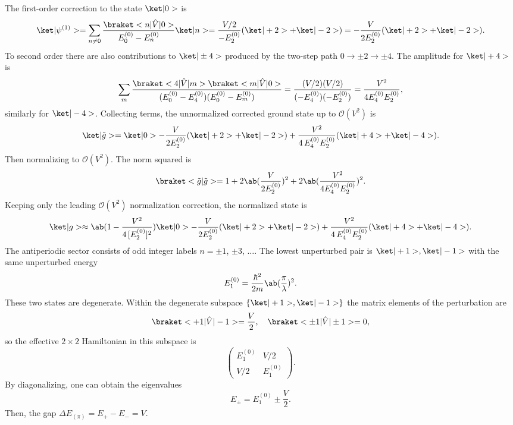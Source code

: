 \begin{solution}
\begin{enumext}
    The first-order correction to the state $\ket|0>$ is
    \[
      \ket|\psi^{(1)}>
    = \sum_{n\neq0}\frac{\braket<n|\hat V|0>}{E_0^{(0)}-E_n^{(0)}}\ket|n>
    = \frac{V/2}{-E_2^{(0)}}(\ket|+2>+\ket|-2>)
    = -\frac{V}{2E_2^{(0)}}(\ket|+2>+\ket|-2>).
    \]
    To second order there are also contributions to $\ket|\pm4>$ produced by
    the two-step path $0 \to \pm2 \to \pm4$. The amplitude for $\ket|+4>$ is
    \[
      \sum_m \frac{\braket<4|\hat V|m>\braket<m|\hat V|0>}
        {(E_0^{(0)}-E_4^{(0)})(E_0^{(0)}-E_m^{(0)})}
    = \frac{(V/2)(V/2)}{(-E_4^{(0)})(-E_2^{(0)})}
    = \frac{V^2}{4E_4^{(0)}E_2^{(0)}},
    \]
    similarly for $\ket|-4>$.
    Collecting terms, the unnormalized corrected ground state up
    to $\mathcal O(V^2)$ is
    \[
      \ket|\tilde g>
    = \ket|0>
      - \frac{V}{2E_2^{(0)}}(\ket|+2>+\ket|-2>)
      + \frac{V^2}{4\,E_4^{(0)}E_2^{(0)}}(\ket|+4>+\ket|-4>).
    \]
    Then normalizing to $\mathcal O(V^2)$. The norm squared is
    \[
      \braket<\tilde g|\tilde g> = 1 + 2\ab(\frac{V}{2E_2^{(0)}})^2
        + 2\ab(\frac{V^2}{4E_4^{(0)}E_2^{(0)}})^2.
    \]
    Keeping only the leading $\mathcal O(V^2)$ normalization correction, the
    normalized state is
    \[
      \ket|g> \approx \ab(1 - \frac{V^2}{4\,[E_2^{(0)}]^2}) \ket|0>
      - \frac{V}{2E_2^{(0)}}(\ket|+2>+\ket|-2>)
      + \frac{V^2}{4\,E_4^{(0)}E_2^{(0)}}(\ket|+4>+\ket|-4>).
    \]
    The antiperiodic sector consists of odd integer labels $n = \pm1$, $\pm3$,
    $\ldots$. The lowest unperturbed pair is $\ket|+1>,\ket|-1>$ with the same
    unperturbed energy
    \[
      E_1^{(0)} = \frac{\hbar^2}{2m}\ab(\frac\pi\lambda)^2.
    \]
    These two states are degenerate. Within the degenerate
    subspace $\{\ket|+1>,\ket|-1>\}$ the matrix elements of the perturbation are
    \[
      \braket<+1|\hat V|-1> = \frac V2,\quad \braket<\pm1|\hat V|\pm1> = 0,
    \]
    so the effective $2\times2$ Hamiltonian in this subspace is
    \[
      \begin{pmatrix}
        E_1^{(0)} & V/2\\
        V/2 & E_1^{(0)}
      \end{pmatrix}.
    \]
    By diagonalizing, one can obtain the eigenvalues
    \[
      E_\pm = E_1^{(0)} \pm \frac V2.
    \]
    Then, the gap $\Delta E_{(\pi)} = E_+ - E_- = V$.
  \end{enumext}
\end{solution}

\clearpage

